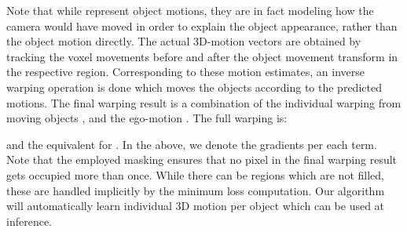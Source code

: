 \documentclass[letterpaper]{article} \usepackage{aaai19}  \usepackage{times}  \usepackage{helvet}  \usepackage{courier}  \usepackage{url}  \usepackage{graphicx}  \frenchspacing
\begin{document}
\noindent Note that while  represent object motions, they are in fact modeling how the camera would have moved in order to explain the object appearance, rather than the object motion directly. The actual 3D-motion vectors are obtained by tracking the voxel movements before and after the object movement transform in the respective region. Corresponding to these motion estimates, an inverse warping operation is done which moves the objects according to the predicted motions. The final warping result is a combination of the individual warping from moving objects , and the ego-motion . The full warping  is:


\noindent and the equivalent for . In the above, we denote the gradients per each term.
Note that the employed masking ensures that no pixel in the final warping result gets occupied more than once. While there can be regions which are not filled, these are handled implicitly by the minimum loss computation.
Our algorithm will automatically learn individual 3D motion per object which can be used at inference.
\end{document}
